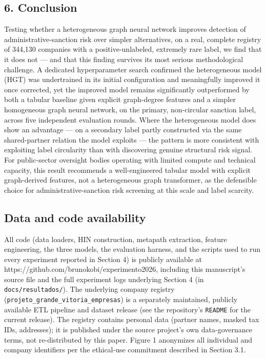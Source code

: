 \documentclass[11pt,]{article}
\begin{document}
\hypertarget{conclusion}{%
\subsection{6. Conclusion}\label{conclusion}}

Testing whether a heterogeneous graph neural network improves detection
of administrative-sanction risk over simpler alternatives, on a real,
complete registry of 344,130 companies with a positive-unlabeled,
extremely rare label, we find that it does not --- and that this finding
survives its most serious methodological challenge. A dedicated
hyperparameter search confirmed the heterogeneous model (HGT) was
undertrained in its initial configuration and meaningfully improved it
once corrected, yet the improved model remains significantly
outperformed by both a tabular baseline given explicit graph-degree
features and a simpler homogeneous graph neural network, on the primary,
non-circular sanction label, across five independent evaluation rounds.
Where the heterogeneous model does show an advantage --- on a secondary
label partly constructed via the same shared-partner relation the model
exploits --- the pattern is more consistent with exploiting label
circularity than with discovering genuine structural risk signal. For
public-sector oversight bodies operating with limited compute and
technical capacity, this result recommends a well-engineered tabular
model with explicit graph-derived features, not a heterogeneous graph
transformer, as the defensible choice for administrative-sanction risk
screening at this scale and label scarcity.

\hypertarget{data-and-code-availability}{%
\subsection{Data and code
availability}\label{data-and-code-availability}}

All code (data loaders, HIN construction, metapath extraction, feature
engineering, the three models, the evaluation harness, and the scripts
used to run every experiment reported in Section 4) is publicly
available at https://github.com/brunokobi/experimento2026, including
this manuscript's source file and the full experiment logs underlying
Section 4 (in \texttt{docs/resultados/}). The underlying company
registry (\texttt{projeto\_grande\_vitoria\_empresas}) is a separately
maintained, publicly available ETL pipeline and dataset release (see the
repository's \texttt{README} for the current release). The registry
contains personal data (partner names, masked tax IDs, addresses); it is
published under the source project's own data-governance terms, not
re-distributed by this paper. Figure 1 anonymizes all individual and
company identifiers per the ethical-use commitment described in Section
3.1.
\end{document}
